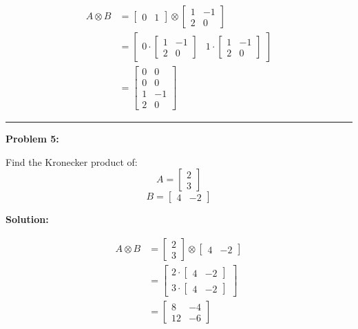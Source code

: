 \documentclass[
  letterpaper,
  DIV=11,
  numbers=noendperiod]{scrreprt}
\theoremstyle{plain}
\theoremstyle{definition}
\theoremstyle{remark}
\begin{document}
\begin{align*}
A \otimes B &= \begin{bmatrix}0&1\end{bmatrix} \otimes \begin{bmatrix}1&-1\\2&0\end{bmatrix} \\
&= \begin{bmatrix}
0 \cdot \begin{bmatrix}1&-1\\2&0\end{bmatrix} & 1 \cdot \begin{bmatrix}1&-1\\2&0\end{bmatrix}
\end{bmatrix} \\
&= \begin{bmatrix}
0 & 0 \\
0 & 0 \\
1 & -1 \\
2 & 0
\end{bmatrix}
\end{align*}

\begin{center}\rule{0.5\linewidth}{0.5pt}\end{center}

\textbf{Problem 5:}

Find the Kronecker product of: \[A=\begin{bmatrix}2\\3\end{bmatrix}\]
\[B=\begin{bmatrix}4&-2\end{bmatrix}\]

\textbf{Solution:}

\begin{align*}
A \otimes B &= \begin{bmatrix}2\\3\end{bmatrix} \otimes \begin{bmatrix}4&-2\end{bmatrix} \\
&= \begin{bmatrix}
2 \cdot \begin{bmatrix}4&-2\end{bmatrix} \\
3 \cdot \begin{bmatrix}4&-2\end{bmatrix}
\end{bmatrix} \\
&= \begin{bmatrix}
8 & -4 \\
12 & -6
\end{bmatrix}
\end{align*}
\end{document}
